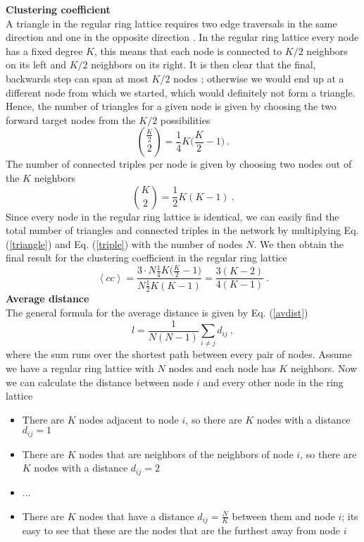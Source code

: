 \documentclass[11 pt , letterpaper , twoside , openright]{book}
\begin{document}
\textbf{Clustering coefficient}\\
\newline
A triangle in the regular ring lattice requires two edge traversals in the same direction and one in the opposite direction \cite{Pele2015}. In the regular ring lattice every node has a fixed degree $K$, this means that each node is connected to $K/2$ neighbors on its left and $K/2$ neighbors on its right. It is then clear that the final, backwards step can span at most $K/2$ nodes \cite{Pele2015}; otherwise we would end up at a different node from which we started, which would definitely not form a triangle.\\
Hence, the number of triangles for a given node is given by choosing the two forward target nodes from the $K/2$ possibilities \cite{Pele2015}
\begin{equation}\label{triangle}
	\binom{\frac{K}{2}}{2} = \frac{1}{4} K \bigg(\frac{K}{2} - 1 \bigg) \ .
\end{equation}
The number of connected triples per node is given by choosing two nodes out of the $K$ neighbors \cite{Pele2015}
\begin{equation}\label{triple}
	\binom{K}{2} = \frac{1}{2} K (K-1) \ .
\end{equation}
Since every node in the regular ring lattice is identical, we can easily find the total number of triangles and connected triples in the network by multiplying Eq. (\ref{triangle}) and Eq. (\ref{triple}) with the number of nodes $N$. We then obtain the final result for the clustering coefficient in the regular ring lattice \cite{Pele2015}
\begin{equation}
	\left<cc\right> = \frac{3\cdot N \frac{1}{4} K \bigg(\frac{K}{2} - 1 \bigg)}{N \frac{1}{2} K (K-1)} = \frac{3(K-2)}{4(K-1)} \ .
\end{equation}
\newline
\textbf{Average distance}\\
\newline
The general formula for the average distance is given by Eq. (\ref{avdist})
\begin{equation}
	l = \frac{1}{N(N-1)} \sum_{i \neq j} d_{ij} \ ,
\end{equation}
where the sum runs over the shortest path between every pair of nodes. Assume we have a regular ring lattice with $N$ nodes and each node has $K$ neighbors. Now we can calculate the distance between node $i$ and every other node in the ring lattice
\begin{itemize}
	\item There are $K$ nodes adjacent to node $i$, so there are $K$ nodes with a distance $d_{ij} = 1$
	\item There are $K$ nodes that are neighbors of the neighbors of node $i$, so there are $K$ nodes with a distance $d_{ij} = 2$
	\item ...
	\item There are $K$ nodes that have a distance $d_{ij} = \frac{N}{K}$ between them and node $i$; its easy to see that these are the nodes that are the furthest away from node $i$ 
\end{itemize}  
\end{document}
